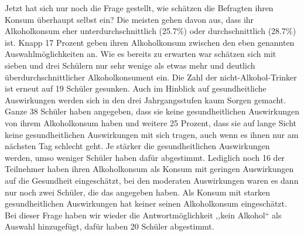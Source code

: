 \documentclass[12pt]{article}
\begin{document}
Jetzt hat sich nur noch die Frage gestellt, wie schätzen die Befragten ihren Konsum überhaupt selbst ein? Die meisten gehen davon aus, dass ihr Alkoholkonsum eher unterdurchschnittlich (25.7\%) oder durchschnittlich (28.7\%) ist. Knapp 17 Prozent geben ihren Alkoholkonsum zwischen den eben genannten Auswahlmöglichkeiten an. Wie es bereits zu erwarten war schätzen sich mit sieben und drei Schülern nur sehr wenige als etwas mehr und deutlich überdurchschnittlicher Alkoholkonsument ein. Die Zahl der nicht-Alkohol-Trinker ist erneut auf 19 Schüler gesunken. Auch im Hinblick auf gesundheitliche Auswirkungen werden sich in den drei Jahrgangsstufen kaum Sorgen gemacht. Ganze 38 Schüler haben angegeben, dass sie keine gesundheitlichen Auswirkungen von ihrem Alkoholkonsum haben und weitere 25 Prozent, dass sie auf lange Sicht keine gesundheitlichen Auswirkungen mit sich tragen, auch wenn es ihnen nur am nächsten Tag schlecht geht. Je stärker die gesundheitlichen Auswirkungen werden, umso weniger Schüler haben dafür abgestimmt. Lediglich noch 16 der Teilnehmer haben ihren Alkoholkonsum als Konsum mit geringen Auswirkungen auf die Gesundheit eingeschätzt, bei den moderaten Auswirkungen waren es dann nur noch zwei Schüler, die das angegeben haben. Als Konsum mit starken gesundheitlichen Auswirkungen hat keiner seinen Alkoholkonsum eingeschätzt. Bei dieser Frage haben wir wieder die Antwortmöglichkeit ,,kein Alkohol“ als Auswahl hinzugefügt, dafür haben 20 Schüler abgestimmt. 
\end{document}
